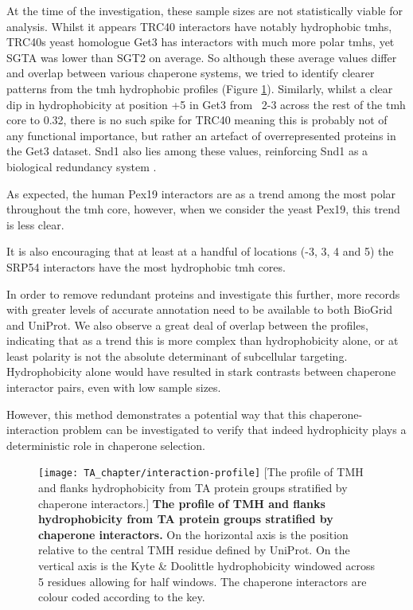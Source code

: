 At the time of the investigation, these sample sizes are not statistically viable for analysis.
Whilst it appears TRC40 interactors have notably hydrophobic \gls{tmh}s, TRC40s yeast homologue Get3 has interactors with much more polar \gls{tmh}s, yet SGTA was lower than SGT2 on average.
So although these average values differ and overlap between various chaperone systems, we tried to identify clearer patterns from the \gls{tmh} hydrophobic profiles (Figure \ref{fig:interaction-profile}).
Similarly, whilst a clear dip in hydrophobicity at position +5 in Get3 from ~2-3 across the rest of the \gls{tmh} core to 0.32, there is no such spike for TRC40 meaning this is probably not of any functional importance, but rather an artefact of overrepresented proteins in the Get3 dataset.
Snd1 also lies among these values, reinforcing Snd1 as a biological redundancy system \cite{Rabu2009, Johnson2013, Schuldiner2008}.

As expected, the human Pex19 interactors are as a trend among the most polar throughout the \gls{tmh} core, however, when we consider the yeast Pex19, this trend is less clear.

It is also encouraging that at least at a handful of locations (-3, 3, 4 and 5) the SRP54 interactors have the most hydrophobic \gls{tmh} cores.

In order to remove redundant proteins and investigate this further, more records with greater levels of accurate annotation need to be available to both BioGrid and UniProt.
We also observe a great deal of overlap between the profiles, indicating that as a trend this is more complex than hydrophobicity alone, or at least polarity is not the absolute determinant of subcellular targeting.
Hydrophobicity alone would have resulted in stark contrasts between chaperone interactor pairs, even with low sample sizes.

However, this method demonstrates a potential way that this chaperone\--interaction problem can be investigated to verify that indeed hydrophicity plays a deterministic role in chaperone selection.

\begin{figure}
\centering
\texttt{[image: TA\_chapter/interaction-profile]}
[The profile of TMH and flanks hydrophobicity from TA protein groups stratified by chaperone interactors.]
{\textbf{The profile of TMH and flanks hydrophobicity from TA protein groups stratified by chaperone interactors.}
On the horizontal axis is the position relative to the central TMH residue defined by UniProt.
On the vertical axis is the Kyte \& Doolittle hydrophobicity windowed across 5 residues allowing for half windows.
The chaperone interactors are colour coded according to the key.
}

\label{fig:interaction-profile}
\end{figure}

